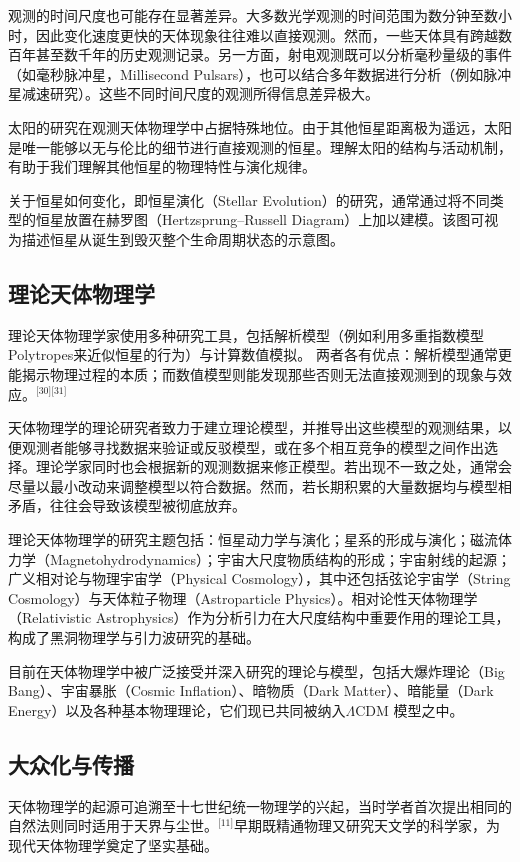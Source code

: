 观测的时间尺度也可能存在显著差异。大多数光学观测的时间范围为数分钟至数小时，因此变化速度更快的天体现象往往难以直接观测。然而，一些天体具有跨越数百年甚至数千年的历史观测记录。另一方面，射电观测既可以分析毫秒量级的事件（如毫秒脉冲星，Millisecond Pulsars），也可以结合多年数据进行分析（例如脉冲星减速研究）。这些不同时间尺度的观测所得信息差异极大。

太阳的研究在观测天体物理学中占据特殊地位。由于其他恒星距离极为遥远，太阳是唯一能够以无与伦比的细节进行直接观测的恒星。理解太阳的结构与活动机制，有助于我们理解其他恒星的物理特性与演化规律。

关于恒星如何变化，即恒星演化（Stellar Evolution）的研究，通常通过将不同类型的恒星放置在赫罗图（Hertzsprung–Russell Diagram）上加以建模。该图可视为描述恒星从诞生到毁灭整个生命周期状态的示意图。
\subsection{理论天体物理学}
理论天体物理学家使用多种研究工具，包括解析模型（例如利用多重指数模型Polytropes来近似恒星的行为）与计算数值模拟。  
两者各有优点：解析模型通常更能揭示物理过程的本质；而数值模型则能发现那些否则无法直接观测到的现象与效应。\(^\text{[30][31]}\)

天体物理学的理论研究者致力于建立理论模型，并推导出这些模型的观测结果，以便观测者能够寻找数据来验证或反驳模型，或在多个相互竞争的模型之间作出选择。理论学家同时也会根据新的观测数据来修正模型。若出现不一致之处，通常会尽量以最小改动来调整模型以符合数据。然而，若长期积累的大量数据均与模型相矛盾，往往会导致该模型被彻底放弃。

理论天体物理学的研究主题包括：恒星动力学与演化；星系的形成与演化；磁流体力学（Magnetohydrodynamics）；宇宙大尺度物质结构的形成；宇宙射线的起源；广义相对论与物理宇宙学（Physical Cosmology），其中还包括弦论宇宙学（String Cosmology）与天体粒子物理（Astroparticle Physics）。相对论性天体物理学（Relativistic Astrophysics）作为分析引力在大尺度结构中重要作用的理论工具，构成了黑洞物理学与引力波研究的基础。

目前在天体物理学中被广泛接受并深入研究的理论与模型，包括大爆炸理论（Big Bang）、宇宙暴胀（Cosmic Inflation）、暗物质（Dark Matter）、暗能量（Dark Energy）以及各种基本物理理论，它们现已共同被纳入$\Lambda$CDM 模型之中。
\subsection{大众化与传播}
天体物理学的起源可追溯至十七世纪统一物理学的兴起，当时学者首次提出相同的自然法则同时适用于天界与尘世。\(^\text{[11]}\)早期既精通物理又研究天文学的科学家，为现代天体物理学奠定了坚实基础。

